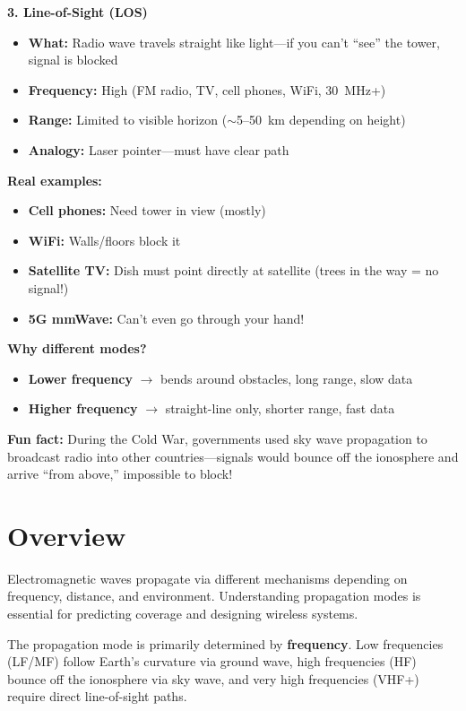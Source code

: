\begin{nontechnical}
\textbf{3. Line-of-Sight (LOS)}
\begin{itemize}
\item \textbf{What:} Radio wave travels straight like light---if you can't ``see'' the tower, signal is blocked
\item \textbf{Frequency:} High (FM radio, TV, cell phones, WiFi, 30~MHz+)
\item \textbf{Range:} Limited to visible horizon ($\sim$5--50~km depending on height)
\item \textbf{Analogy:} Laser pointer---must have clear path
\end{itemize}

\textbf{Real examples:}
\begin{itemize}
\item \textbf{Cell phones:} Need tower in view (mostly)
\item \textbf{WiFi:} Walls/floors block it
\item \textbf{Satellite TV:} Dish must point directly at satellite (trees in the way = no signal!)
\item \textbf{5G mmWave:} Can't even go through your hand!
\end{itemize}

\textbf{Why different modes?}
\begin{itemize}
\item \textbf{Lower frequency} $\rightarrow$ bends around obstacles, long range, slow data
\item \textbf{Higher frequency} $\rightarrow$ straight-line only, shorter range, fast data
\end{itemize}

\textbf{Fun fact:} During the Cold War, governments used sky wave propagation to broadcast radio into other countries---signals would bounce off the ionosphere and arrive ``from above,'' impossible to block!
\end{nontechnical}

\section{Overview}

Electromagnetic waves propagate via different mechanisms depending on frequency, distance, and environment. Understanding propagation modes is essential for predicting coverage and designing wireless systems.

\begin{keyconcept}
The propagation mode is primarily determined by \textbf{frequency}. Low frequencies (LF/MF) follow Earth's curvature via ground wave, high frequencies (HF) bounce off the ionosphere via sky wave, and very high frequencies (VHF+) require direct line-of-sight paths.
\end{keyconcept}

